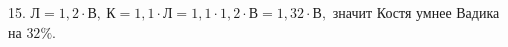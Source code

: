 15. $\text{Л}=1,2\cdot\text{В},\ \text{К}=1,1\cdot\text{Л}=1,1\cdot1,2\cdot\text{В}=1,32\cdot\text{В},$ значит Костя умнее Вадика на $32\%.$\\
